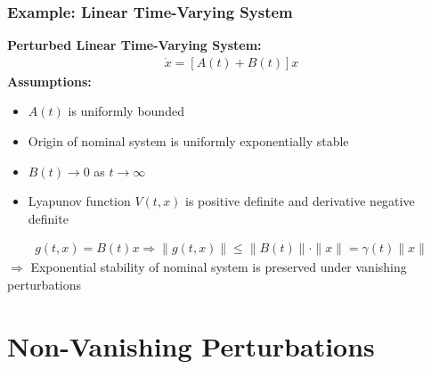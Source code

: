 \documentclass[student, noshadow, lsr, english, aspectratio=169, t]{ITR_LSR_slides}
\begin{document}
\begin{frame}
	\frametitle{Example: Linear Time-Varying System}
	\textbf{Perturbed Linear Time-Varying System:}
	\begin{align*}
		\dot{x}=[A(t)+B(t)]x
	\end{align*}
	\textbf{Assumptions:}
	\begin{itemize}
		\item $A(t)$ is uniformly bounded
		\item Origin of nominal system is uniformly exponentially stable
		\item $B(t) \rightarrow 0$ as $t\rightarrow\infty$
		\item Lyapunov function $V(t,x)$ is positive definite and derivative negative definite
	\end{itemize}
	\begin{align*}
		g(t,x) = B(t)x \Rightarrow \|g(t,x)\| \leq \|B(t)\| \cdot \|x\| = \gamma(t) \|x\|
	\end{align*}
	$\Rightarrow$ Exponential stability of nominal system is preserved under vanishing perturbations
	
\end{frame}

\section{Non-Vanishing Perturbations}
\end{document}
